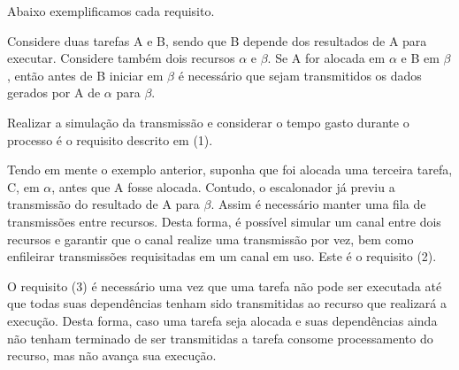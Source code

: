 \documentclass[a4paper,10pt, draft]{article}
\begin{document}
Abaixo exemplificamos cada requisito.

Considere duas tarefas A e B, sendo que B depende dos resultados de A para executar.
Considere também dois recursos $\alpha$ e $\beta$.
Se A for alocada em $\alpha$ e B em $\beta$, então antes de B iniciar em $\beta$ é necessário
que sejam transmitidos os dados gerados por A de $\alpha$ para $\beta$.

Realizar a simulação da transmissão e considerar o tempo gasto durante o processo é o
requisito descrito em (1).

Tendo em mente o exemplo anterior, suponha que foi alocada uma terceira tarefa, C, em
$\alpha$, antes que A fosse alocada. Contudo, o escalonador já previu a transmissão do
resultado de A para $\beta$. Assim é necessário manter uma fila de transmissões entre
recursos. Desta forma, é possível simular um canal entre dois recursos e garantir que
o canal realize uma transmissão por vez, bem como enfileirar transmissões requisitadas
em um canal em uso. Este é o requisito (2).

O requisito (3) é necessário uma vez que uma tarefa não pode ser executada até que todas
suas dependências tenham sido transmitidas ao recurso que realizará a execução. Desta forma,
caso uma tarefa seja alocada e suas dependências ainda não tenham terminado de ser transmitidas
a tarefa consome processamento do recurso, mas não avança sua execução.
\end{document}
